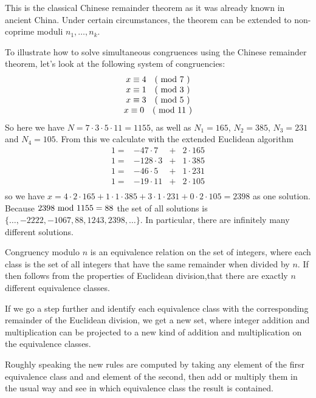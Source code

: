 \begin{remark}
This is the classical Chinese remainder theorem as it was already known in ancient China. Under certain circumstances, the theorem can be extended to non-coprime moduli $ n_1, \ldots, n_k $.
\end{remark}
\begin{example} To illustrate how to solve simultaneous congruences using the Chinese remainder theorem, let's look at the following system of congruencies:
$$
\begin{array}{c}
x \equiv 4 \quad \text{( mod } 7 \text{ )} \\
x \equiv 1 \quad \text{( mod } 3 \text{ )} \\
x \equiv 3 \quad \text{( mod } 5 \text{ )} \\
x \equiv 0 \quad \text{( mod } 11 \text{ )} \\
\end{array}
$$
So here we have $ N = 7 \cdot 3 \cdot 5 \cdot 11 = 1155 $, as well as
$ N_1 = 165 $, $ N_2 = 385 $, $ N_3 = 231 $ and $ N_4 = 105 $. From this we calculate with the extended Euclidean algorithm
$$
\begin{array}{cccc}
 1 = & -47 \cdot 7 & + & 2 \cdot 165 \\
 1 = & -128 \cdot 3 & + & 1 \cdot 385 \\
 1 = & -46 \cdot 5 & + & 1 \cdot 231 \\
 1 = & -19 \cdot 11 & + & 2 \cdot 105 \\
\end{array}
$$
so we have
$x = 4 \cdot 2 \cdot 165 + 1 \cdot 1 \cdot 385 + 3 \cdot 1 \cdot 231 + 0 \cdot 2 \cdot 105 = 2398$
as one solution. Because $ 2398 \text{ mod } 1155 = 88 $ the set of all solutions is
$ \{\ldots, -2222, -1067,88,1243, 2398, \ldots \} $. In particular, there are infinitely many different solutions.
\end{example}

Congruency modulo $ n $ is an equivalence relation on the set of integers, where each class is the set of all integers that have the same remainder when divided by $n$. If then follows from the properties of Euclidean division,that there are exactly $ n $ different equivalence classes. 

If we go a step further and identify each equivalence class with the corresponding remainder of the Euclidean division, we get a new set, where integer addition and multiplication can be projected to a new kind of addition and multiplication on the equivalence classes. 

Roughly speaking the new rules are computed by taking any element of the firsr equivalence class and and element of the second, then add or multiply them in the usual way and see in which equivalence class the result is contained.

